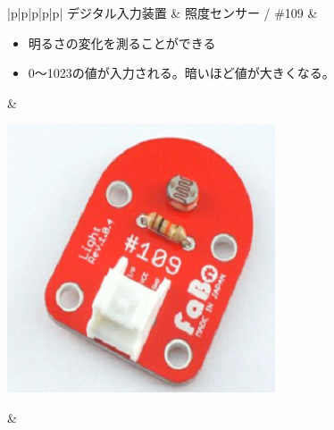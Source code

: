 \begin{table}[H]
{\begin{tabular}{|p{\colA}|p{\colB}|p{\colC}|p{\colD}|p{\colE}|}
			デジタル入力装置 & 照度センサー / \#109 & 
			\begin{minipage}[t]{\linewidth}
				\begin{itemize}
					\item 明るさの変化を測ることができる
					\item 0〜1023の値が入力される。暗いほど値が大きくなる。
				\end{itemize}
				\smallskip
			\end{minipage} & 
			\begin{minipage}[t]{\linewidth}
				\smallskip
				\centering
				\includegraphics[width=0.8\linewidth]{images/chap05/text05-img024.png}
				\smallskip
			\end{minipage} &
			\pageref{light}\\ \hline


\end{tabular}}
\end{table}
